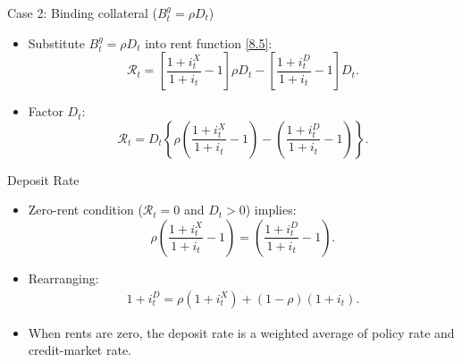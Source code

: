 \documentclass[11pt,aspectratio=169]{beamer}
\begin{document}
\begin{frame}{Case 2: Binding collateral ($B_t^g = \rho D_t$)}
  \begin{itemize}
    \item Substitute $B_t^g = \rho D_t$ into rent function \eqref{8.5}:
$$\mathcal{R}_t
      = \left[\frac{1+i_t^X}{1+i_t} - 1\right] \rho D_t
        - \left[\frac{1+i_t^D}{1+i_t} - 1\right] D_t.$$
        \vspace{0.3cm}
    \item Factor $D_t$:
$$\mathcal{R}_t
      = D_t \left\{
        \rho\left(\frac{1+i_t^X}{1+i_t} - 1\right)
        - \left(\frac{1+i_t^D}{1+i_t} - 1\right)
      \right\}.$$
\end{itemize}
\end{frame}






\begin{frame}{Deposit Rate}
\begin{itemize}
    \item Zero-rent condition ($\mathcal{R}_t=0$ and $D_t>0$) implies:
$$\rho\left(\frac{1+i_t^X}{1+i_t} - 1\right)
      = \left(\frac{1+i_t^D}{1+i_t} - 1\right).$$
      \vspace{0.3cm}
     \item Rearranging:
\begin{align}
    1+i_t^D
    = \rho(1+i_t^X) + (1-\rho)(1+i_t).\label{8.6}
\end{align}
    \item When rents are zero, the deposit rate is a weighted average of policy rate and credit-market rate.
\end{itemize}

\end{frame}
\end{document}
